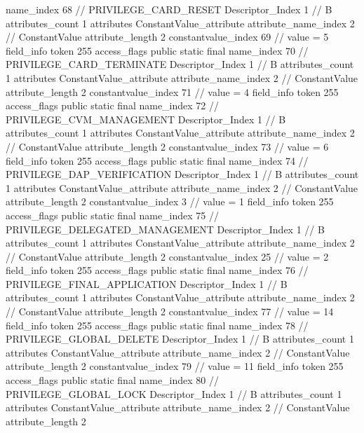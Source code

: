 {{{{{				name_index	68		// PRIVILEGE_CARD_RESET
				Descriptor_Index	1		// B
				attributes_count	1
				attributes {
				ConstantValue_attribute {
					attribute_name_index	2		// ConstantValue
					attribute_length	2
					constantvalue_index	69		// value = 5
				}
				}
			}
			field_info {
				token	255
				access_flags	public static final
				name_index	70		// PRIVILEGE_CARD_TERMINATE
				Descriptor_Index	1		// B
				attributes_count	1
				attributes {
				ConstantValue_attribute {
					attribute_name_index	2		// ConstantValue
					attribute_length	2
					constantvalue_index	71		// value = 4
				}
				}
			}
			field_info {
				token	255
				access_flags	public static final
				name_index	72		// PRIVILEGE_CVM_MANAGEMENT
				Descriptor_Index	1		// B
				attributes_count	1
				attributes {
				ConstantValue_attribute {
					attribute_name_index	2		// ConstantValue
					attribute_length	2
					constantvalue_index	73		// value = 6
				}
				}
			}
			field_info {
				token	255
				access_flags	public static final
				name_index	74		// PRIVILEGE_DAP_VERIFICATION
				Descriptor_Index	1		// B
				attributes_count	1
				attributes {
				ConstantValue_attribute {
					attribute_name_index	2		// ConstantValue
					attribute_length	2
					constantvalue_index	3		// value = 1
				}
				}
			}
			field_info {
				token	255
				access_flags	public static final
				name_index	75		// PRIVILEGE_DELEGATED_MANAGEMENT
				Descriptor_Index	1		// B
				attributes_count	1
				attributes {
				ConstantValue_attribute {
					attribute_name_index	2		// ConstantValue
					attribute_length	2
					constantvalue_index	25		// value = 2
				}
				}
			}
			field_info {
				token	255
				access_flags	public static final
				name_index	76		// PRIVILEGE_FINAL_APPLICATION
				Descriptor_Index	1		// B
				attributes_count	1
				attributes {
				ConstantValue_attribute {
					attribute_name_index	2		// ConstantValue
					attribute_length	2
					constantvalue_index	77		// value = 14
				}
				}
			}
			field_info {
				token	255
				access_flags	public static final
				name_index	78		// PRIVILEGE_GLOBAL_DELETE
				Descriptor_Index	1		// B
				attributes_count	1
				attributes {
				ConstantValue_attribute {
					attribute_name_index	2		// ConstantValue
					attribute_length	2
					constantvalue_index	79		// value = 11
				}
				}
			}
			field_info {
				token	255
				access_flags	public static final
				name_index	80		// PRIVILEGE_GLOBAL_LOCK
				Descriptor_Index	1		// B
				attributes_count	1
				attributes {
				ConstantValue_attribute {
					attribute_name_index	2		// ConstantValue
					attribute_length	2
}}}}}}}
